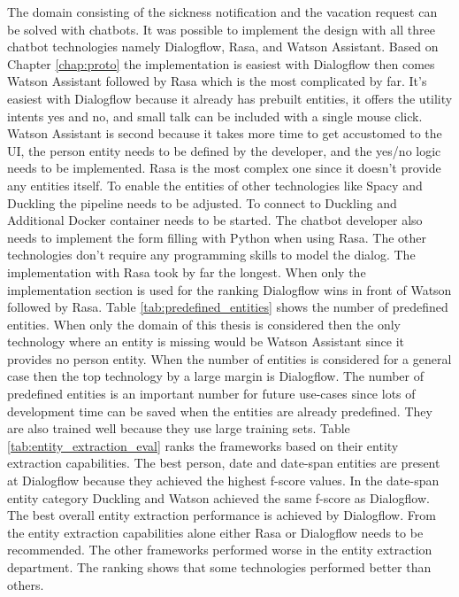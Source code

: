 
The domain consisting of the sickness notification and the vacation request 
can be solved with chatbots.
It was possible to implement the design with all three chatbot 
technologies namely Dialogflow, Rasa, and Watson Assistant.
Based on Chapter \ref{chap:proto} the implementation is 
easiest with Dialogflow then comes Watson Assistant followed by 
Rasa which is the most complicated by far.
It's easiest with Dialogflow because it already has prebuilt entities,
it offers the utility intents yes and no, and small talk can be 
included with a single mouse click.
Watson Assistant is second because it takes more time to get accustomed 
to the UI, the person entity needs to be defined by the developer,
and the yes/no logic needs to be implemented.
Rasa is the most complex one since it doesn't provide any entities 
itself.
To enable the entities of other technologies like Spacy and Duckling the 
pipeline needs to be adjusted.
To connect to Duckling and Additional Docker container needs to be started.
The chatbot developer also needs to implement the form filling with Python 
when using Rasa. 
The other technologies don't require any programming skills to model the 
dialog.
The implementation with Rasa took by far the longest.
When only the implementation section is used for the ranking 
Dialogflow wins in front of Watson followed by Rasa.
Table \ref{tab:predefined_entities} shows the number of predefined entities.
When only the domain of this thesis is considered then the only technology 
where an entity is missing would be Watson Assistant since it provides no person entity.
When the number of entities is considered for a general case then the 
top technology by a large margin is Dialogflow.
The number of predefined entities is an important number for future use-cases since 
lots of development time can be saved when the entities are already predefined.
They are also trained well because they use large training sets.
Table \ref{tab:entity_extraction_eval} ranks the frameworks based on their 
entity extraction capabilities.
The best person, date and date-span entities are present at Dialogflow because they achieved the 
highest f-score values.
In the date-span entity category Duckling and Watson achieved the same f-score as Dialogflow.
The best overall entity extraction performance is achieved by Dialogflow. 
From the entity extraction capabilities alone either Rasa or 
Dialogflow needs to be recommended.
The other frameworks performed worse in the entity extraction 
department.
The ranking shows that some technologies performed better than others.
